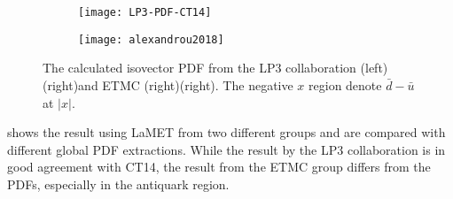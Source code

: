 \documentclass[../main.tex]{subfiles}
\begin{document}
\begin{figure}[h!]
\centering
\begin{subfigure}{0.45\linewidth}
\texttt{[image: LP3-PDF-CT14]}
\end{subfigure}
\begin{subfigure}{0.45\linewidth}
\texttt{[image: alexandrou2018]}
\end{subfigure}
\caption{The calculated isovector PDF from the LP3 collaboration (left)
\cite{alexandrou2018}(right)and ETMC (right)\cite{alexandrou2018}(right).
The negative $x$ region denote $\bar{d}-\bar{u}$ at $\left|x\right|$.}
\label{fig:lamet}
\end{figure}
 shows the result using LaMET from two different groups and are compared with
different global PDF extractions. While the result by the LP3 collaboration
is in good agreement with CT14, the result from the ETMC group differs from the PDFs,
especially in the antiquark region. 
\end{document}
